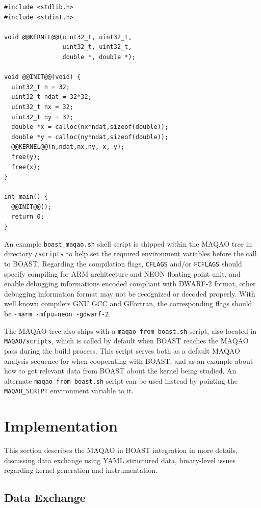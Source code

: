 \documentclass[11pt, a4paper, twoside]{montblanc2}
\begin{document}
\lstset{style=C}
\begin{lstlisting}
#include <stdlib.h>
#include <stdint.h>

void @@KERNEL@@(uint32_t, uint32_t,
                uint32_t, uint32_t,
                double *, double *);

void @@INIT@@(void) {
  uint32_t n = 32;
  uint32_t ndat = 32*32;
  uint32_t nx = 32;
  uint32_t ny = 32;
  double *x = calloc(nx*ndat,sizeof(double));
  double *y = calloc(ny*ndat,sizeof(double));
  @@KERNEL@@(n,ndat,nx,ny, x, y);
  free(y);
  free(x);
}

int main() {
  @@INIT@@();
  return 0;
}
\end{lstlisting}

An example \verb|boast_maqao.sh| shell script is shipped within the MAQAO tree in directory 
\verb|/scripts| to help set the required environment variables before the call to BOAST. Regarding 
the compilation flags, \texttt{CFLAGS} and/or \texttt{FCFLAGS} should specify compiling for ARM 
architecture and NEON floating point unit, and enable debugging informations encoded compliant with 
DWARF-2 format, other debugging information format may not be recognized or decoded properly. With 
well known compilers GNU GCC and GFortran, the corresponding flags should be
\verb|-marm -mfpu=neon -gdwarf-2|.

The MAQAO tree also ships with a \verb|maqao_from_boast.sh| script, also located in 
\verb|MAQAO/scripts|, which is called by default when BOAST reaches the MAQAO pass during the build 
process. This script serves both as a default MAQAO analysis sequence for when cooperating with 
BOAST, and as an example about how to get relevant data from BOAST about the kernel being studied. 
An alternate \verb|maqao_from_boast.sh| script can be used instead by pointing the 
\verb|MAQAO_SCRIPT| environment variable to it.

\section{Implementation}

This section describes the MAQAO in BOAST integration in more details, discussing data exchange 
using YAML structured data, binary-level issues regarding kernel generation and instrumentation.

\subsection{Data Exchange}
\end{document}
